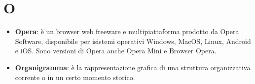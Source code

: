 \section{O}
\begin{itemize}
	\item
	\textbf{Opera}: è un browser web freeware e multipiattaforma prodotto da Opera Software, disponibile per isistemi operativi Windows, MacOS, Linux, Android e iOS. Sono versioni di Opera anche Opera Mini e Browser Opera.
	\item 
	\textbf{Organigramma}: è la rappresentazione grafica di una struttura organizzativa corrente o in un certo momento storico.
\end{itemize}